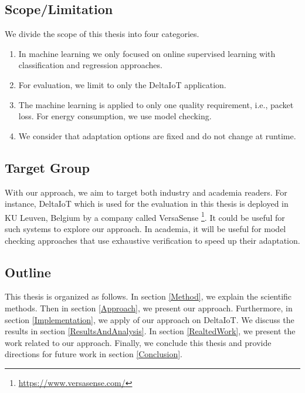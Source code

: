 \documentclass[a4paper,12pt]{article}
\begin{document}
\subsection{Scope/Limitation}
We divide the scope of this thesis into four categories.
\begin{enumerate}
	\item In machine learning we only focused on online supervised learning with classification and regression approaches.
	\item For evaluation, we limit to only the DeltaIoT application.
	\item The machine learning is applied to only one quality requirement, i.e., packet loss. For energy consumption, we use model checking.
	\item We consider that adaptation options are fixed and do not change at runtime.
\end{enumerate}
\subsection{Target Group}
With our approach, we aim to target both industry and academia readers. For instance, DeltaIoT which is used for the evaluation in this thesis is deployed in KU Leuven, Belgium by a company called VersaSense \footnote{\url{https://www.versasense.com/}}. It could be useful for such systems to explore our approach. In academia, it will be useful for model checking approaches that use exhaustive verification to speed up their adaptation.
\subsection{Outline}
This thesis is organized as follows. In section \ref{Method}, we explain the scientific methods. Then in section \ref{Approach}, we present our approach. Furthermore, in section \ref{Implementation}, we apply of our approach on DeltaIoT. We discuss the results in section \ref{ResultsAndAnalysis}. In section \ref{RealtedWork}, we present the work related to our approach. Finally, we conclude this thesis and provide directions for future work in section \ref{Conclusion}. 
\newpage
\end{document}
